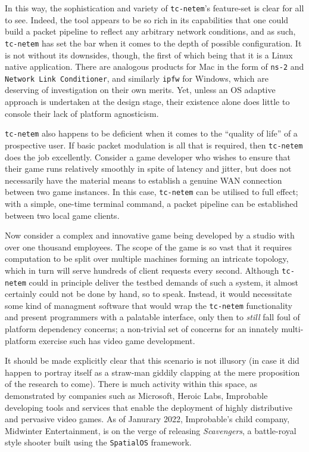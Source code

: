 In this way, the sophistication and variety of \texttt{tc-netem}'s feature-set is clear for all to see. Indeed, the
tool appears to be so rich in its capabilities that one could build a packet pipeline to reflect any arbitrary
network conditions, and as such, \texttt{tc-netem} has set the bar when it comes to the depth of possible
configuration. It is not without its downsides, though, the first of which being that it is a Linux native
application. There are analogous products for Mac in the form of \texttt{ns-2}\cite{ns_2_man, ns_2_wiki} and
\texttt{Network Link Conditioner}\cite{nlc}, and similarly \texttt{ipfw}\cite{ipfw,ipfw_man} for Windows, which are
deserving of investigation on their own merits. Yet, unless an OS adaptive approach is undertaken at the design
stage, their existence alone does little to console their lack of platform agnosticism.

\texttt{tc-netem} also happens to be deficient when it comes to the ``quality of life'' of a prospective user. If basic
packet modulation is all that is required, then \texttt{tc-netem} does the job excellently. Consider a game developer
who wishes to ensure that their game runs relatively smoothly in spite of latency and jitter, but does not necessarily
have the material means to establish a genuine WAN\cite{wan_cisco} connection between two game instances. In this
case, \texttt{tc-netem} can be utilised to full effect; with a simple, one-time terminal command, a packet pipeline
can be established between two local game clients.

Now consider a complex and innovative game being developed by a
studio with over one thousand employees. The scope of the game is so vast that it requires computation to be split over
multiple machines forming an intricate topology, which in turn will serve hundreds of client requests every second.
Although \texttt{tc-netem} could in principle deliver the testbed demands of such a system, it almost certainly
could not be done by hand, so to speak. Instead, it would necessitate some kind of managment software that would wrap
the \texttt{tc-netem} functionality and present programmers with a palatable interface, only then to \emph{still}
fall foul of platform dependency concerns; a non-trivial set of concerns for an innately multi-platform exercise such
has video game development.

It should be made explicitly clear that this scenario is not illusory (in case it did happen to portray itself as a
straw-man giddily clapping at the mere proposition of the research to come). There is much activity within this
space, as demonstrated by companies such as Microsoft, Heroic Labs, Improbable developing tools and services that
enable the deployment of highly distributive and pervasive video games\cite{microsoft_playfab, heroic_labs_nakama,
    improbable_spatialos, improbable_spatialos_unreal_gdk_github}. As of Janurary 2022, Improbable's child company,
Midwinter Entertainment, is on the verge of releasing \emph{Scavengers}\cite{improbable_spatialos_scavengers}, a
battle-royal style shooter built using the \texttt{SpatialOS} framework\cite{improbable_spatialos,
    improbable_spatialos_unreal_gdk_github}.

